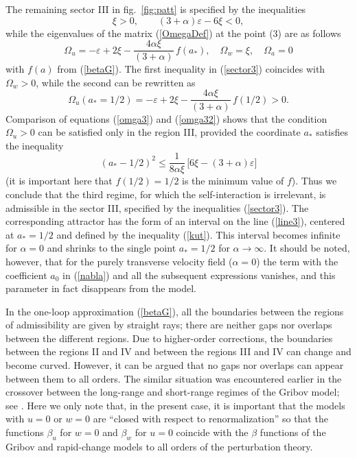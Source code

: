 \documentclass[12pt]{iopart}
\begin{document}
The remaining sector III in fig.~\ref{fig:patt} is specified by the
inequalities
\begin{equation}
\xi > 0, \qquad (3+\alpha) \varepsilon -6\xi<0,
\label{sector3}
\end{equation}
while the eigenvalues of the matrix (\ref{OmegaDef}) at the point (3)
are as follows
\begin{equation}
\Omega_{u} =  -\varepsilon+2\xi- \frac{4\alpha\xi}{(3+\alpha)}\, f(a_{*}),
\quad \Omega_{w} = \xi, \quad \Omega_{a} = 0
\label{omga3}
\end{equation}
with $f(a)$ from (\ref{betaG}). The first inequality in (\ref{sector3})
coincides with $\Omega_{w}>0$, while the second can be rewritten as
\begin{equation}
\Omega_{u}({a_{*}=1/2}) = -\varepsilon+2\xi-
\frac{4\alpha\xi}{(3+\alpha)}\, f(1/2) >0.
\label{omga32}
\end{equation}
Comparison of equations (\ref{omga3}) and (\ref{omga32}) shows that the
condition $\Omega_{u}>0$ can be satisfied only in the region III, provided
the coordinate $a_{*}$ satisfies the inequality
\begin{equation}
(a_{*}-1/2)^{2} \le \frac{1}{8\alpha\xi}\,
\bigl[ 6\xi- (3+\alpha)\varepsilon \bigr]
\label{kut}
\end{equation}
(it is important here that $f(1/2)=1/2$ is the minimum value of $f$).
Thus we conclude that the third regime, for which the self-interaction is
irrelevant, is admissible in the sector III, specified by the inequalities
(\ref{sector3}). The corresponding attractor has the form of an interval
on the line (\ref{line3}), centered at $a_{*}=1/2$ and defined by the
inequality (\ref{kut}). This interval becomes infinite for $\alpha=0$
and shrinks to the single point $a_{*}=1/2$ for $\alpha\to\infty$.
It should be noted, however, that for the purely transverse velocity
field ($\alpha=0$) the term with the coefficient $a_{0}$ in (\ref{nabla})
and all the subsequent expressions vanishes, and this parameter in fact
disappears from the model.


In the one-loop approximation (\ref{betaG}), all the boundaries between the
regions of admissibility are given by straight rays; there are neither gaps
nor overlaps between the different regions. Due to higher-order corrections,
the boundaries between the regions II and IV and between the regions III and
IV can change and become curved. However, it can be argued that no gaps nor
overlaps can appear between them to all orders. The similar situation was
encountered earlier in the crossover between the long-range and short-range
regimes of the Gribov model; see \cite{Levy}. Here we only note that,
in the present case, it is important that the models with $u=0$ or $w=0$ are
``closed with respect to renormalization'' so that the functions $\beta_{u}$
for $w=0$ and $\beta_{w}$ for $u=0$ coincide with the $\beta$ functions of
the Gribov and rapid-change models to all orders of the perturbation theory.
\end{document}
